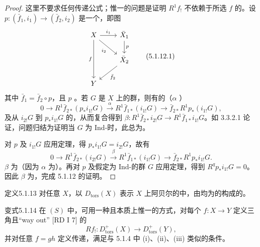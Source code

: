 \begin{proof}
这里不要求任何传递公式；惟一的问题是证明 $R^1f_!$ 不依赖于所选 $f$ 的。设 $p:(\bar f_1,i_1)\to(\bar f_2,i_2)$ 是一个，即图
\[\begin{tikzcd}X\arrow[r,"i_1"]\arrow[dr,"i_2"']\arrow[dd,"f"']&\bar X_1\arrow[d,"p"]\\&\bar X_2\arrow[dl,"\bar f_2"]\\Y&\end{tikzcd}\tag{5.1.12.1}\]
其中 $\bar f_1=\bar f_2\circ p$，且 $p$ 。若 $G$ 是 $X$ 上的群，则有的（$\alpha$ ）
\[0\longrightarrow R^1\bar f_{2*}(p_*i_{1!}G)\xrightarrow{\alpha}R^1\bar f_{1*}(i_{1!}G)\longrightarrow\bar f_{2*}R^1p_*(i_{1!}G),\]
及从 $i_{2!}G$ 到 $p_*i_{1!}G$ 的，从而复合得到 $\beta:R^1\bar f_{2*}i_{2!}G\to R^1\bar f_{1*}i_{1!}G$。如 3.3.2.1 论证，问题归结为证明当 $G$ 为 Ind-时，此总为。

对 $p$ 及 $i_{1!}G$ 应用定理，得 $p_*i_{1!}G=i_{2!}G$，故有
\[0\longrightarrow R^1\bar f_{2*}(i_{2!}G)\xrightarrow{\beta}R^1\bar f_{1*}(i_{1!}G)\longrightarrow\bar f_{2*}R^1p_*i_{1!}G.\]
 $\beta$ 为（因为 $\alpha$ 为）。再对 $p$ 及假定为 Ind-的群 $G$ 应用定理，得到 $R^qp_*i_{1!}G=0$。因此 $\beta$ 为，完成 5.1.12 的证明。
\end{proof}
\begin{SGAresult}{定义}{5.1.13}
对任意 $X$，以 $D_{\mathrm{tors}}(X)$ 表示 $X$ 上阿贝尔的中，由均为的构成的。
\end{SGAresult}
\begin{SGAresult}{变式}{5.1.14}
在 $(S)$ 中，可用一种且本质上惟一的方式，对每个 $f:X\to Y$ 定义三角且“way out” [RD I 7] 的
\[Rf_!:D^+_{\mathrm{tors}}(X)\longrightarrow D^+_{\mathrm{tors}}(Y),\]
并对任意 $f=gh$ 定义传递，满足与 5.1.4 中 (i)、(ii)、(iii) 类似的条件。
\end{SGAresult}
